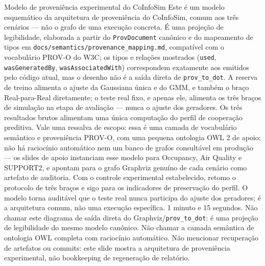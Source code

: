 \begin{frame}{Modelo de proveniência experimental do CoInfoSim}
  \speakernotes
    {Este é um modelo esquemático da arquitetura de proveniência do CoInfoSim, comum aos três cenários --- não o grafo de uma execução concreta. É uma projeção de legibilidade, elaborada a partir do \texttt{ProvDocument} canônico e do mapeamento de tipos em \texttt{docs/semantics/provenance\_mapping.md}, compatível com o vocabulário PROV-O do W3C; os tipos e relações mostrados (\texttt{used}, \texttt{wasGeneratedBy}, \texttt{wasAssociatedWith}) correspondem exatamente aos emitidos pelo código atual, mas o desenho não é a saída direta de \texttt{prov\_to\_dot}. A reserva de treino alimenta o ajuste da Gaussiana única e do GMM, e também o braço Real-para-Real diretamente; o teste real fixo, e apenas ele, alimenta os três braços de simulação na etapa de avaliação --- nunca o ajuste dos geradores. Os três resultados brutos alimentam uma única computação do perfil de cooperação preditiva. Vale uma ressalva de escopo: essa é uma camada de vocabulário semântico e proveniência PROV-O, com uma pequena ontologia OWL 2 de apoio; não há raciocínio automático nem um banco de grafos consultável em produção --- os slides de apoio instanciam esse modelo para Occupancy, Air Quality e SUPPORT2, e apontam para o grafo Graphviz genuíno de cada cenário como artefato de auditoria.}
    {Com o controle experimental estabelecido, retomo o protocolo de três braços e sigo para os indicadores de preservação do perfil.}
    {O modelo torna auditável que o teste real nunca participa do ajuste dos geradores; é a arquitetura comum, não uma execução específica.}
    {1 minuto e 15 segundos.}
    {Não chamar este diagrama de saída direta do Graphviz/\texttt{prov\_to\_dot}: é uma projeção de legibilidade do mesmo modelo canônico. Não chamar a camada semântica de ontologia OWL completa com raciocínio automático. Não mencionar recuperação de artefatos ou commits: este slide mostra a arquitetura de proveniência experimental, não bookkeeping de regeneração de relatório.}
\end{frame}

